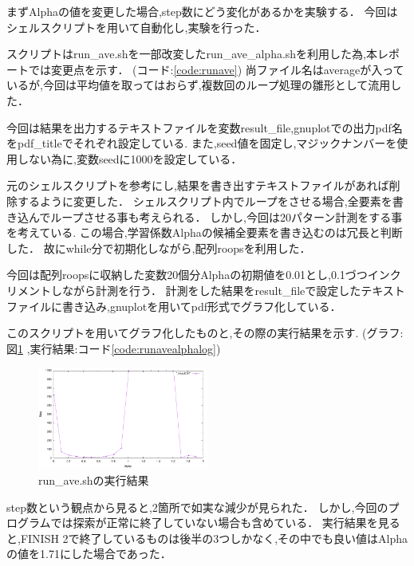 まずAlphaの値を変更した場合,step数にどう変化があるかを実験する．
今回はシェルスクリプトを用いて自動化し,実験を行った．

スクリプトはrun\_ave.shを一部改変したrun\_ave\_alpha.shを利用した為,本レポートでは変更点を示す． (コード:\ref{code:runave})
尚ファイル名はaverageが入っているが,今回は平均値を取ってはおらず,複数回のループ処理の雛形として流用した．



今回は結果を出力するテキストファイルを変数result\_file,gnuplotでの出力pdf名をpdf\_titleでそれぞれ設定している.
また,seed値を固定し,マジックナンバーを使用しない為に,変数seedに1000を設定している．

元のシェルスクリプトを参考にし,結果を書き出すテキストファイルがあれば削除するように変更した．
シェルスクリプト内でループをさせる場合,全要素を書き込んでループさせる事も考えられる．
しかし,今回は20パターン計測をする事を考えている.
この場合,学習係数Alphaの候補全要素を書き込むのは冗長と判断した．
故にwhile分で初期化しながら,配列roops\cite{shellq}を利用した．

今回は配列roopsに収納した変数20個分Alphaの初期値を0.01とし,0.1づつインクリメントしながら計測を行う．
計測をした結果をresult\_fileで設定したテキストファイルに書き込み,gnuplotを用いてpdf形式でグラフ化している．


このスクリプトを用いてグラフ化したものと,その際の実行結果を示す. (グラフ:図\ref{fig:runavesh} ,実行結果:コード\ref{code:runavealphalog})


\begin{figure}[H]
    \centering
    \includegraphics[width=0.5\textwidth]{figs/level2.3/alpha_ave.pdf}
    \caption{run\_ave.shの実行結果}
\label{fig:runavesh}
\end{figure}

step数という観点から見ると,2箇所で如実な減少が見られた．
しかし,今回のプログラムでは探索が正常に終了していない場合も含めている．
実行結果を見ると,FINISH 2で終了しているものは後半の3つしかなく,その中でも良い値はAlphaの値を1.71にした場合であった．

